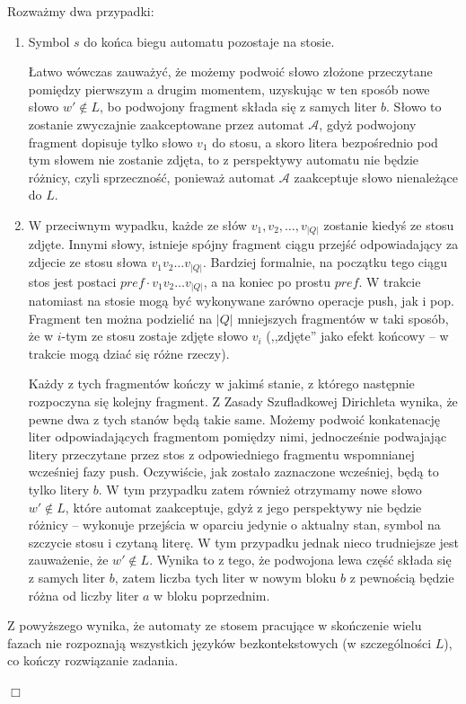 \documentclass[12pt]{article}
\begin{document}
	\medskip
	
	Rozważmy dwa przypadki:
	\begin{enumerate}
		\item Symbol \(s\) do końca biegu automatu pozostaje na stosie.
		      
		      Łatwo wówczas zauważyć, że możemy podwoić słowo złożone
		      przeczytane pomiędzy pierwszym a drugim momentem, uzyskując w ten
		      sposób nowe słowo \(w' \notin L\), bo podwojony fragment składa
		      się z samych liter \(b\). Słowo to zostanie zwyczajnie
		      zaakceptowane przez automat \(\mathcal{A}\), gdyż podwojony
		      fragment dopisuje tylko słowo \(v_{1}\) do stosu, a skoro litera
		      bezpośrednio pod tym słowem nie zostanie zdjęta, to z perspektywy
		      automatu nie będzie różnicy, czyli sprzeczność, ponieważ automat
		      \(\mathcal{A}\) zaakceptuje słowo nienależące do \(L\).
		
		\item W przeciwnym wypadku, każde ze słów \(v_{1}, v_{2}, \ldots,
		      v_{\left| Q \right|}\) zostanie kiedyś ze stosu zdjęte. Innymi
		      słowy, istnieje spójny fragment ciągu przejść odpowiadający za
		      zdjecie ze stosu słowa \(v_{1} v_{2} \ldots v_{\left| Q
		      \right|}\). Bardziej formalnie, na początku tego ciągu stos jest
		      postaci \(pref \cdot v_{1} v_{2} \ldots v_{\left| Q \right|}\), a
		      na koniec po prostu \(pref\). W trakcie natomiast na stosie mogą
		      być wykonywane zarówno operacje push, jak i pop. Fragment ten
		      można podzielić na \(\left| Q \right|\) mniejszych fragmentów w
		      taki sposób, że w \(i\)-tym ze stosu zostaje zdjęte słowo
		      \(v_{i}\) (,,zdjęte'' jako efekt końcowy -- w trakcie mogą dziać
		      się różne rzeczy).
		      
		      \medskip
		      
		      Każdy z tych fragmentów kończy w jakimś stanie, z którego
		      następnie rozpoczyna się kolejny fragment. Z Zasady Szufladkowej
		      Dirichleta wynika, że pewne dwa z tych stanów będą takie same.
		      Możemy podwoić konkatenację liter odpowiadających fragmentom
		      pomiędzy nimi, jednocześnie podwajając litery przeczytane przez
		      stos z odpowiedniego fragmentu wspomnianej wcześniej fazy push.
		      Oczywiście, jak zostało zaznaczone wcześniej, będą to tylko litery
		      \(b\). W tym przypadku zatem również otrzymamy nowe słowo \(w'
		      \notin L\), które automat zaakceptuje, gdyż z jego perspektywy nie
		      będzie różnicy -- wykonuje przejścia w oparciu jedynie o aktualny
		      stan, symbol na szczycie stosu i czytaną literę. W tym przypadku
		      jednak nieco trudniejsze jest zauważenie, że \(w' \notin L\).
		      Wynika to z tego, że podwojona lewa część składa się z samych
		      liter \(b\), zatem liczba tych liter w nowym bloku \(b\) z
		      pewnością będzie różna od liczby liter \(a\) w bloku poprzednim.
	\end{enumerate}
	
	\medskip
	
	Z powyższego wynika, że automaty ze stosem pracujące w skończenie wielu
	fazach nie rozpoznają wszystkich języków bezkontekstowych (w szczególności
	\(L\)), co kończy rozwiązanie zadania.
	\begin{flushright}
		\(\Box\)
	\end{flushright}
\end{document}
